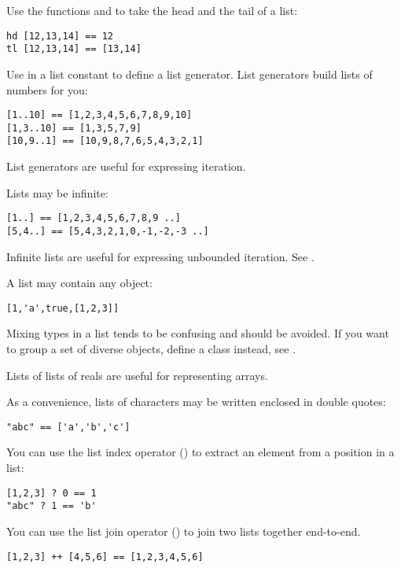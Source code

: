 Use the functions  and  to take the head and the
tail of a list:

\begin{verbatim}
hd [12,13,14] == 12
tl [12,13,14] == [13,14]
\end{verbatim}

Use  in a list constant to define a list generator. List generators
build lists of numbers for you:

\begin{verbatim}
[1..10] == [1,2,3,4,5,6,7,8,9,10]
[1,3..10] == [1,3,5,7,9]
[10,9..1] == [10,9,8,7,6,5,4,3,2,1]
\end{verbatim}

\noindent
List generators are useful for expressing iteration. 

Lists may be infinite:

\begin{verbatim}
[1..] == [1,2,3,4,5,6,7,8,9 ..]
[5,4..] == [5,4,3,2,1,0,-1,-2,-3 ..]
\end{verbatim}

\noindent
Infinite lists are useful for expressing unbounded iteration.
See .

A list may contain any object:

\begin{verbatim}
[1,'a',true,[1,2,3]] 
\end{verbatim}

\noindent
Mixing types in a list tends to be confusing and should be avoided. If you
want to group a set of diverse objects, define a class instead, 
see .

Lists of lists of reals are useful for representing arrays.

As a convenience, lists of characters may be written enclosed in double
quotes:

\begin{verbatim}
"abc" == ['a','b','c']
\end{verbatim}

You can use the list index operator () to extract an element from a
position in a list:

\begin{verbatim}
[1,2,3] ? 0 == 1
"abc" ? 1 == 'b'
\end{verbatim}

You can use the list join operator (\ct{++}) to join two lists together
end-to-end.

\begin{verbatim}
[1,2,3] ++ [4,5,6] == [1,2,3,4,5,6]
\end{verbatim}

